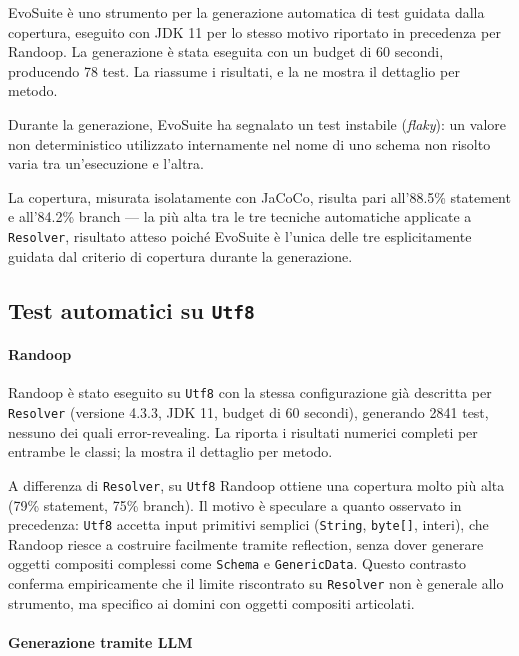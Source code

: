 EvoSuite è uno strumento per la generazione automatica di test guidata
dalla copertura, eseguito con JDK 11 per lo stesso motivo riportato in
precedenza per Randoop. La generazione è stata eseguita con un budget
di 60 secondi, producendo 78 test. La 
riassume i risultati, e la  ne
mostra il dettaglio per metodo.

Durante la generazione, EvoSuite ha segnalato un test instabile
(\emph{flaky}): un valore non deterministico utilizzato internamente
nel nome di uno schema non risolto varia tra un'esecuzione e l'altra.

La copertura, misurata isolatamente con JaCoCo, risulta pari
all'88.5\% statement e all'84.2\% branch — la più alta tra le tre
tecniche automatiche applicate a \texttt{Resolver}, risultato atteso
poiché EvoSuite è l'unica delle tre esplicitamente guidata dal
criterio di copertura durante la generazione.

\subsection{Test automatici su \texttt{Utf8}}

\paragraph{Randoop}

Randoop è stato eseguito su \texttt{Utf8} con la stessa configurazione
già descritta per \texttt{Resolver} (versione 4.3.3, JDK 11, budget di
60 secondi), generando 2841 test, nessuno dei quali error-revealing.
La  riporta i risultati numerici completi
per entrambe le classi; la  mostra il
dettaglio per metodo.

A differenza di \texttt{Resolver}, su \texttt{Utf8} Randoop ottiene una
copertura molto più alta (79\% statement, 75\% branch). Il motivo è
speculare a quanto osservato in precedenza: \texttt{Utf8} accetta
input primitivi semplici (\texttt{String}, \texttt{byte[]}, interi),
che Randoop riesce a costruire facilmente tramite reflection, senza
dover generare oggetti compositi complessi come \texttt{Schema} e
\texttt{GenericData}. Questo contrasto conferma empiricamente che il
limite riscontrato su \texttt{Resolver} non è generale allo strumento,
ma specifico ai domini con oggetti compositi articolati.
\paragraph{Generazione tramite LLM}

